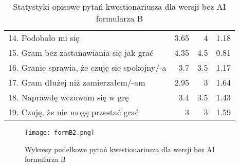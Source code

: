 \begin{table}[h!]
\begin{center}
\begin{tabular}{|m{10em}|r|r|r|}
            14. Podobało mi się                                               & 3.65          & 4       & 1.18           \\
            15. Gram bez zastanawiania się jak grać                           & 4.35          & 4.5     & 0.81           \\
            16. Granie sprawia, \newline że czuję się spokojny/-a             & 3.7           & 3.5     & 1.17           \\
            17. Gram dłużej \newline niż zamierzałem/-am                      & 2.95          & 3       & 1.64           \\
            18. Naprawdę wczuwam się w grę                                    & 3.4           & 3.5     & 1.43           \\
            19. Czuję, że nie mogę przestać grać                              & 3             & 3       & 1.59           \\
            \hline
        \end{tabular}
    \end{center}
    \caption{Statystyki opisowe pytań kwestionariusza dla wersji bez AI formularza B}\label{tab1:ch7_9}
\end{table}

\begin{figure}[h!]
    \centering
    \texttt{[image: formB2.png]}
    \caption{Wykresy pudełkowe pytań kwestionariusza dla wersji bez AI formularza B}
    \label{fig:ch7_formB2}
\end{figure}

